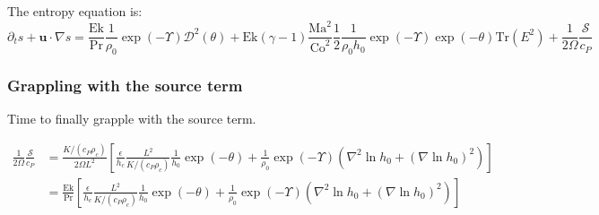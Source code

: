 \documentclass{aastex62}
\newcommand{\del}{\nabla}
\renewcommand{\vec}{\boldsymbol}
\newcommand{\scrD}{\mathcal{D}}
\newcommand{\scrS}{\mathcal{S}}
\begin{document}
The entropy equation is:
\begin{equation}
  \partial_t s + \vec{u}\cdot \del s =
  \frac{\mathrm{Ek}}{\mathrm{Pr}} \frac{1}{\rho_0} \exp(-\Upsilon)\scrD^2(\theta)
  + \mathrm{Ek} (\gamma-1)\frac{\mathrm{Ma}^{2}}{\mathrm{Co}^2} \frac{1}{2}\frac{1}{\rho_0 h_0}\exp(-\Upsilon) \exp(-\theta)\mathrm{Tr}(E^2)
  + \frac{1}{2 \Omega} \frac{\scrS}{c_P}
\end{equation}

\subsubsection{Grappling with the source term}
Time to finally grapple with the source term.

\begin{align}
  \frac{1}{2 \Omega} \frac{\scrS}{c_P}
&= \frac{K/(c_P \rho_c)}{2 \Omega L^2} \left[\frac{\epsilon}{h_c} \frac{L^2}{K/(c_P \rho_c)}\frac{1}{h_0}\exp(-\theta) +  \frac{1}{\rho_0} \exp(-\Upsilon) \left(\nabla^2 \ln h_0 + (\nabla \ln h_0)^2 \right)\right] \nonumber \\
&= \frac{\mathrm{Ek}}{\mathrm{Pr}}\left[\frac{\epsilon}{h_c} \frac{L^2}{K/(c_P \rho_c)}\frac{1}{h_0}\exp(-\theta) +  \frac{1}{\rho_0} \exp(-\Upsilon) \left(\nabla^2 \ln h_0 + (\nabla \ln h_0)^2 \right)\right]
\end{align}
\end{document}
